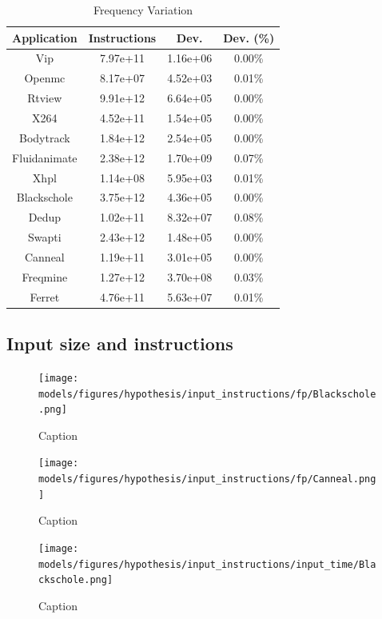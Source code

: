 \begin{table}[H]
	\caption{Frequency Variation}
	\begin{tabular}{|c|c|c|c|}
		\hline
		Application  & Instructions & Dev.     & Dev. (\%) \\ \hline
		Vip          & 7.97e+11     & 1.16e+06 & 0.00\%    \\ \hline
		Openmc       & 8.17e+07     & 4.52e+03 & 0.01\%    \\ \hline
		Rtview       & 9.91e+12     & 6.64e+05 & 0.00\%    \\ \hline
		X264         & 4.52e+11     & 1.54e+05 & 0.00\%    \\ \hline
		Bodytrack    & 1.84e+12     & 2.54e+05 & 0.00\%    \\ \hline
		Fluidanimate & 2.38e+12     & 1.70e+09 & 0.07\%    \\ \hline
		Xhpl         & 1.14e+08     & 5.95e+03 & 0.01\%    \\ \hline
		Blackschole  & 3.75e+12     & 4.36e+05 & 0.00\%    \\ \hline
		Dedup        & 1.02e+11     & 8.32e+07 & 0.08\%    \\ \hline
		Swapti       & 2.43e+12     & 1.48e+05 & 0.00\%    \\ \hline
		Canneal      & 1.19e+11     & 3.01e+05 & 0.00\%    \\ \hline
		Freqmine     & 1.27e+12     & 3.70e+08 & 0.03\%    \\ \hline
		Ferret       & 4.76e+11     & 5.63e+07 & 0.01\%    \\ \hline
	\end{tabular}
\end{table}

\subsection{Input size and instructions}

\begin{figure}[H]
	\centering
	\texttt{[image: models/figures/hypothesis/input\_instructions/fp/Blackschole.png]}
	\caption{Caption}
	\label{fig:my_label}
\end{figure}

\begin{figure}[H]
	\centering
	\texttt{[image: models/figures/hypothesis/input\_instructions/fp/Canneal.png]}
	\caption{Caption}
	\label{fig:my_label}
\end{figure}

\begin{figure}[H]
	\centering
	\texttt{[image: models/figures/hypothesis/input\_instructions/input\_time/Blackschole.png]}
	\caption{Caption}
	\label{fig:my_label}
\end{figure}

